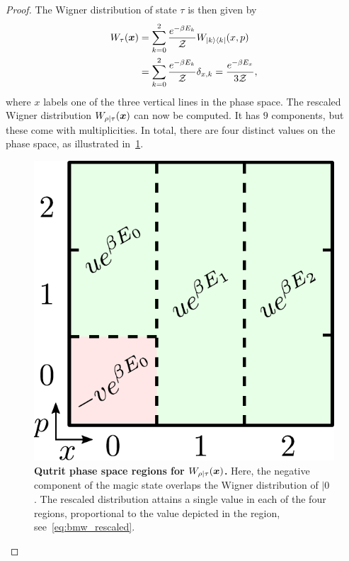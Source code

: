 \documentclass[pra,
aps,
twocolumn,
superscriptaddress,
groupedaddress,
nofootinbib,
reprint
]{revtex4-1}
\begin{document}
\begin{proof}
The Wigner distribution of state $\tau$ is then given by
\begin{align}
	\W[\bmx]{\tau} &= \sum\limits_{k=0}^2 \frac{e^{-\beta E_k}}{\Z}W_{|k\>\<k|}(x, p) \nonumber\\
	&= \sum\limits_{k=0}^2 \frac{e^{-\beta E_k}}{\Z} \delta_{x, k} = \frac{e^{-\beta E_x}}{3\Z},
\end{align}
where $x$ labels one of the three vertical lines in the phase space.
The rescaled Wigner distribution $W_{\rho|\tau}(\boldsymbol{x})$ can now be computed. It has $9$ components, but these come with multiplicities. In total, there are four distinct values on the phase space, as illustrated in~\cref{fig:pd_split}.
\begin{figure}[h]
    \centering
    \includegraphics[scale=0.35]{figs/pd_split_thermal.pdf}
    \caption{\textbf{Qutrit phase space regions for $W_{\rho | \tau}(\boldsymbol{x})$.}
    Here, the negative component of the magic state overlaps the Wigner distribution of $|0\>$. The rescaled distribution attains a single value in each of the four regions, proportional to the value depicted in the region, see~\cref{eq:bmw_rescaled}.
    }
    \label{fig:pd_split}
\end{figure}


\end{proof}
\end{document}
